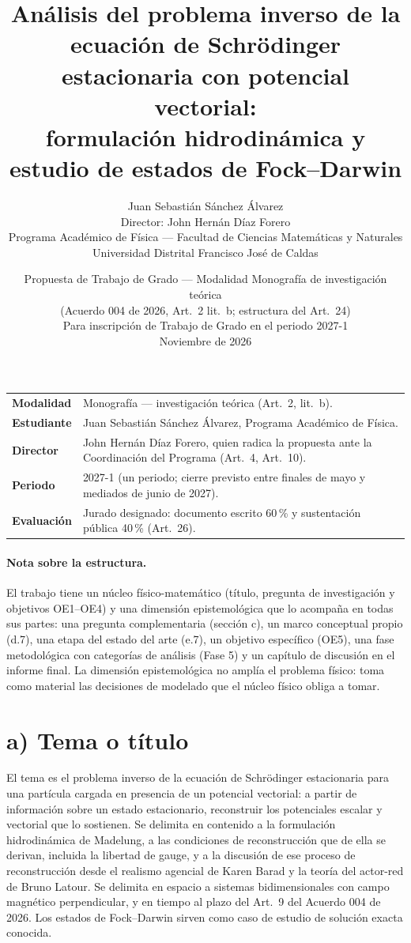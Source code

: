 \documentclass[12pt,letterpaper]{article}
\title{\textbf{Análisis del problema inverso de la ecuación de Schrödinger\\
estacionaria con potencial vectorial:\\
formulación hidrodinámica y estudio de estados de Fock--Darwin}}
\author{Juan Sebastián Sánchez Álvarez\\
\small Director: John Hernán Díaz Forero\\
\small Programa Académico de Física --- Facultad de Ciencias Matemáticas y Naturales\\
\small Universidad Distrital Francisco José de Caldas}
\date{\small Propuesta de Trabajo de Grado --- Modalidad Monografía de investigación teórica\\
(Acuerdo 004 de 2026, Art.~2 lit.~b; estructura del Art.~24)\\
Para inscripción de Trabajo de Grado en el periodo 2027-1 \\ Noviembre de 2026}
\begin{document}
\maketitle

\begin{center}
\begin{tabular}{@{}p{4cm} p{10.5cm}@{}}
\toprule
\textbf{Modalidad} & Monografía --- investigación teórica (Art.~2, lit.~b). \\
\textbf{Estudiante} & Juan Sebastián Sánchez Álvarez, Programa Académico de Física. \\
\textbf{Director} & John Hernán Díaz Forero, quien radica la propuesta ante la Coordinación del Programa (Art.~4, Art.~10). \\
\textbf{Periodo} & 2027-1 (un periodo; cierre previsto entre finales de mayo y mediados de junio de 2027). \\
\textbf{Evaluación} & Jurado designado: documento escrito 60\,\% y sustentación pública 40\,\% (Art.~26). \\
\bottomrule
\end{tabular}
\end{center}

\paragraph{Nota sobre la estructura.} El trabajo tiene un núcleo físico-matemático (título, pregunta de investigación
y objetivos OE1--OE4) y una dimensión epistemológica que lo acompaña en todas sus partes: una pregunta complementaria
(sección c), un marco conceptual propio (d.7), una etapa del estado del arte (e.7), un objetivo específico (OE5), una fase
metodológica con categorías de análisis (Fase 5) y un capítulo de discusión en el informe final. La dimensión
epistemológica no amplía el problema físico: toma como material las decisiones de modelado que el núcleo físico obliga a
tomar.

\section*{a) Tema o título}
El tema es el problema inverso de la ecuación de Schrödinger estacionaria para una partícula cargada en presencia de un
potencial vectorial: a partir de información sobre un estado estacionario, reconstruir los potenciales escalar y
vectorial que lo sostienen. Se delimita en contenido a la formulación hidrodinámica de Madelung, a las condiciones de
reconstrucción que de ella se derivan, incluida la libertad de gauge, y a la discusión de ese proceso de reconstrucción
desde el realismo agencial de Karen Barad y la teoría del actor-red de Bruno Latour. Se delimita en espacio a sistemas
bidimensionales con campo magnético perpendicular, y en tiempo al plazo del Art.~9 del Acuerdo 004 de 2026. Los estados de
Fock--Darwin sirven como caso de estudio de solución exacta conocida.
\end{document}
